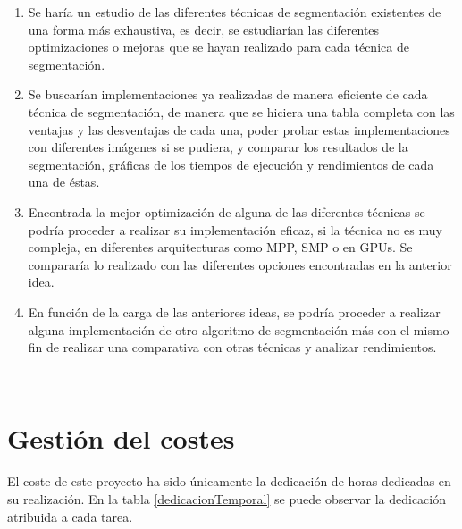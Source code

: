 \begin{enumerate}
	\item Se har\'{i}a un estudio de las diferentes t\'{e}cnicas de segmentaci\'{o}n existentes de una forma m\'{a}s exhaustiva, es decir, se estudiar\'{i}an las diferentes optimizaciones o mejoras que se hayan realizado para cada t\'{e}cnica de segmentaci\'{o}n. 
	\item Se buscar\'{i}an implementaciones ya realizadas de manera eficiente de cada t\'{e}cnica de segmentaci\'{o}n, de manera que se hiciera una tabla completa con las ventajas y las desventajas de cada una, poder probar estas implementaciones con diferentes im\'{a}genes si se pudiera, y comparar los resultados de la segmentaci\'{o}n, gr\'{a}ficas de los tiempos de ejecuci\'{o}n y rendimientos de cada una de \'{e}stas. 
	\item Encontrada la mejor optimizaci\'{o}n de alguna de las diferentes t\'{e}cnicas se podr\'{i}a proceder a realizar su implementaci\'{o}n eficaz, si la t\'{e}cnica no es muy compleja, en diferentes arquitecturas como MPP, SMP o en GPUs. Se comparar\'{i}a lo realizado con las diferentes opciones encontradas en la anterior idea. 
	\item En funci\'{o}n de la carga de las anteriores ideas, se podr\'{i}a proceder a realizar alguna implementaci\'{o}n de otro algoritmo de segmentaci\'{o}n m\'{a}s con el mismo fin de realizar una comparativa con otras t\'{e}cnicas y analizar rendimientos.
\end{enumerate}
 
\

\section{Gesti\'{o}n del costes}

El coste de este proyecto ha sido \'{u}nicamente la dedicaci\'{o}n de horas dedicadas en su realizaci\'{o}n. En la tabla \ref{dedicacionTemporal} se puede observar la dedicaci\'{o}n atribuida a cada tarea.
 
\

